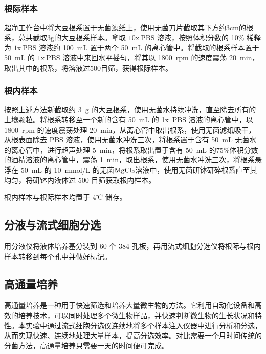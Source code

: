 \documentclass{ctexart}
\begin{document}
    \subsubsection{根际样本}
        \qquad 超净工作台中将大豆根系置于无菌滤纸上，使用无菌刀片截取其下方约3cm的根系，总共截取3g的大豆根系样本。拿取 $\mathrm{10x~PBS}$ 溶液，按照体积分数的 10\% 稀释为 $\mathrm{1x~ PBS}$ 溶液约 100~mL 置于两个 50~mL 的离心管中。将截取的根系样本置于 50~mL 的 $\mathrm{1x~ PBS}$ 溶液中来回水平摇匀，将其以 1800~rpm 的速度震荡 20~min，取出其中的根系，将溶液过500目筛，获得根际样本。

    \subsubsection{根内样本}
        \qquad 按照上述方法新截取约 3~g 的大豆根系，使用无菌水持续冲洗，直至除去所有的土壤颗粒。将根系转移至一个新的含有 50~mL 的 1x~PBS 溶液的离心管中，以 1800~rpm 的速度震荡处理 20~min，从离心管中取出根系，使用无菌滤纸吸干，从根表面除去 PBS 溶液，使用无菌水冲洗三次，将根系置于含有 50~mL 无菌水的离心管中，进行超声处理 5~min，将根系取出置于含有 50~mL 的75\%体积分数的酒精溶液的离心管中，震荡 1~min，取出根系，使用无菌水冲洗三次，将根系悬浮在 50~mL 的 10~mmol/L 的无菌$\ce{MgCl2}$溶液中，使用无菌研钵研碎根系直至其均匀，将研钵内液体过 500 目筛获取根内样本\cite{ref2}。

        \qquad 根内样本与根际样本均置于 4℃ 储存。

    \subsection{分液与流式细胞分选}

    \qquad 用分液仪将液体培养基分装到 60 个 384 孔板，再用流式细胞分选仪将根际与根内样本转移到每个孔中并做好标记。

    \subsection{高通量培养}
    \qquad 高通量培养是一种用于快速筛选和培养大量微生物的方法。它利用自动化设备和高效的培养技术，可以同时处理多个微生物样品，并快速判断微生物的生长状况和特性。本实验中通过流式细胞分选仪连续地将多个样本注入仪器中进行分析和分选，从而实现快速、连续地处理大量样本，提高分选效率。对比需要一个月时间传统的分菌方法，高通量培养只需要一天的时间便可完成。
\end{document}
